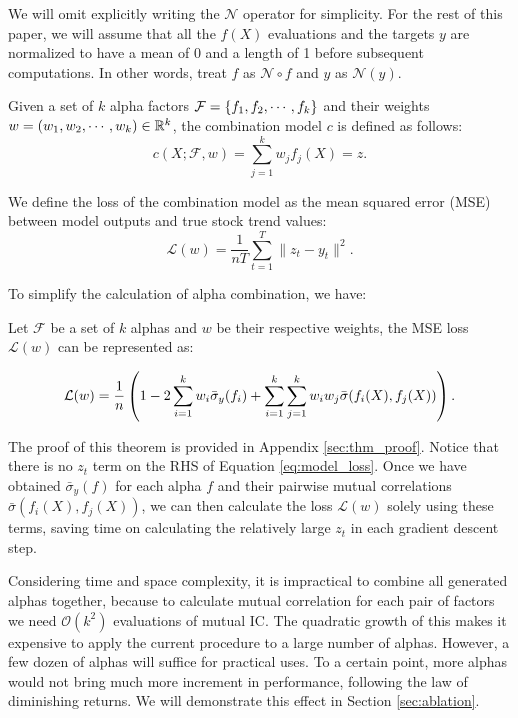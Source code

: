 We will omit explicitly writing the $\mathcal{N}$ operator for simplicity. For the rest of this paper, we will assume that all the $f(X)$ evaluations and the targets $y$ are normalized to have a mean of 0 and a length of 1 before subsequent computations. In other words, treat $f$ as $\mathcal{N} \circ f$ and $y$ as $\mathcal{N}(y)$.

Given a set of $k$ alpha factors $\mathcal{F} = \left\lbrace f_1, f_2, \cdots, f_k\right\rbrace$ and their weights $w = \left(w_1, w_2, \cdots, w_k\right) \in \mathbb{R}^k$, the combination model $c$ is defined as follows:
\begin{equation}
    c(X; \mathcal{F}, w)
    = \sum_{j=1}^{k} w_j f_j(X) = z.
\end{equation}

We define the loss of the combination model as the mean squared error (MSE) between model outputs and true stock trend values:
\begin{equation}
    \mathcal{L}(w) = \frac{1}{nT}\sum_{t=1}^{T} \|z_t - y_t\|^2.
\end{equation}

To simplify the calculation of alpha combination, we have:

\begin{theorem} \label{thm:loss_transformation}
Let $\mathcal{F}$ be a set of $k$ alphas and $w$ be their respective weights, the MSE loss $\mathcal{L}(w)$ can be represented as:

\begin{equation} \label{eq:model_loss}
    \begin{aligned}
        \mathcal{L}(w) = \frac{1}{n} \left(
            1 - 2 \sum_{i=1}^{k} w_i \bar{\sigma}_y(f_i) + \sum_{i=1}^{k} \sum_{j=1}^{k} w_i w_j \bar{\sigma}(f_i(X), f_j(X))
        \right).
    \end{aligned}
\end{equation}

\end{theorem}

The proof of this theorem is provided in Appendix \ref{sec:thm_proof}. Notice that there is no $z_t$ term on the RHS of Equation \ref{eq:model_loss}. Once we have obtained $\bar{\sigma}_{y}(f)$ for each alpha $f$ and their pairwise mutual correlations $\bar{\sigma}(f_i(X),f_j(X))$, we can then calculate the loss $\mathcal{L}(w)$ solely using these terms, saving time on calculating the relatively large $z_t$ in each gradient descent step.
 
Considering time and space complexity, it is impractical to combine all generated alphas together, because to calculate mutual correlation for each pair of factors we need $\mathcal{O}(k^2)$ evaluations of mutual IC. The quadratic growth of this makes it expensive to apply the current procedure to a large number of alphas. However, a few dozen of alphas will suffice for practical uses. To a certain point, more alphas would not bring much more increment in performance, following the law of diminishing returns. We will demonstrate this effect in Section \ref{sec:ablation}.

